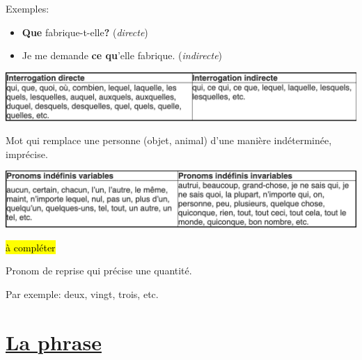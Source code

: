 \documentclass[10pt, french]{article}
\begin{document}
\begin{multicols*}{2}
\begin{definitionNOHFILLsub}
Exemples:
\begin{itemize}
	\item	\textbf{Que} fabrique-t-elle\textbf{?} (\textit{directe})
	\item	Je me demande \textbf{ce qu}'elle fabrique. (\textit{indirecte})
\end{itemize}
\begin{center}
	\includegraphics[width=0.9\columnwidth]{pronom-interg}
\end{center}
\end{definitionNOHFILLsub}

\begin{definitionNOHFILLsub}
Mot qui remplace une personne (objet, animal) d'une manière indéterminée, imprécise.

\tcbline

\begin{center}
	\includegraphics[width=0.9\columnwidth]{pronom-indef}
\end{center}
\hl{à compléter}
\end{definitionNOHFILLsub}

\begin{definitionNOHFILLsub}
Pronom de reprise qui précise une quantité.

\tcbline

Par exemple: deux, vingt, trois, etc.
\end{definitionNOHFILLsub}



\newpage
\section*{\href{http://www.alloprof.qc.ca/bv/pages/f1128.aspx}{La phrase}}


\end{multicols*}
\end{document}
